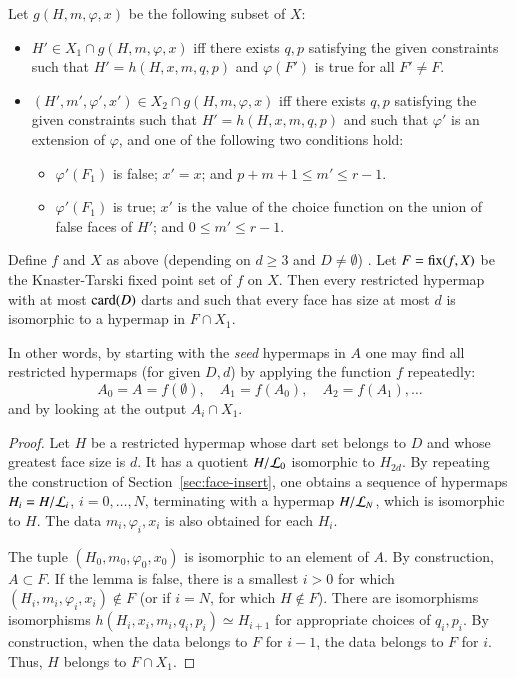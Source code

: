 Let $g(H,m,\varphi,x)$ be the following subset of $X$:
\begin{itemize}
\item $H'\in X_1\cap g(H,m,\varphi,x)$ iff there exists $q,p$ satisfying the given constraints such that $H'=h(H,x,m,q,p)$ and $\varphi(F')$ is true for all $F'\ne F$.
\item $(H',m',\varphi',x')\in X_2\cap g(H,m,\varphi,x)$ iff there exists $q,p$ satisfying the given constraints such that $H'=h(H,x,m,q,p)$ and such that $\varphi'$ is an extension of $\varphi$, and one of the following two conditions hold:
  \begin{itemize}
    \item $\varphi'(F_1)$ is false;  $x' = x$; and  $p+m+1 \le m' \le r-1$.
     \item $\varphi'(F_1)$ is true; $x'$ is the value of the choice function on the union of false faces of $H'$; and $0 \le m' \le r-1$.
  \end{itemize}
\end{itemize}



\begin{lemma}  
Define $f $ and $X$ as above (depending on $d\ge 3$ and $D\ne \emptyset$) .   Let $F={\operatorname{fix}}(f,X)$ be the Knaster-Tarski fixed point set of $f$ on $X$.   Then every restricted hypermap with at most ${\operatorname{card}}(D)$ darts and such that every face has size at most $d$ is isomorphic to a hypermap in $F\cap X_1$.
\end{lemma}

In other words, by starting with the {\it seed} hypermaps in $A$ one may find all restricted hypermaps (for given $D,d$) by applying the function $f$ repeatedly:
$$
A_0 = A = f(\emptyset),\quad A_1 = f(A_0),\quad A_2 = f(A_1),\ldots
$$
and by looking at the output $A_i \cap X_1$.

\begin{proof}  Let $H$ be a restricted hypermap whose dart set belongs to $D$ and whose greatest face size is $d$.  It has a quotient $H/{\cal L}_0$ isomorphic to $H_{2d}$.  By repeating the construction of Section~\ref{sec:face-insert}, one obtains a sequence of hypermaps $H_i = H/{\cal L}_i$, $i=0,\ldots,N$, terminating with a hypermap $H/{\cal L}_N$, which is isomorphic to $H$.  The data $m_i,\varphi_i,x_i$ is also obtained for each $H_i$.

The tuple $(H_0,m_0,\varphi_0,x_0)$ is isomorphic to an element of $A$.   By construction,
$A\subset F$.  If the lemma is false, there is a smallest $i>0$ for which $(H_i,m_i,\varphi_i,x_i)\not\in F$  (or if $i=N$, for which $H\not\in F$).   There are isomorphisms isomorphisms $h(H_i,x_i,m_i,q_i,p_i) \simeq H_{i+1}$ for appropriate choices of $q_i,p_i$.  By construction, when the data belongs to $F$ for $i-1$, the data belongs to $F$ for $i$.  Thus, $H$ belongs to $F\cap X_1$.
\end{proof}

